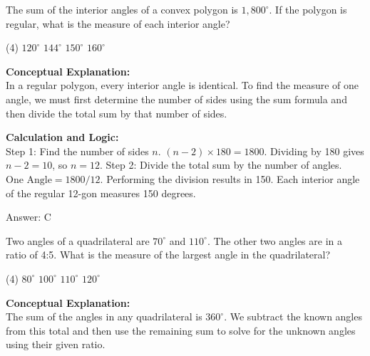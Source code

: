 \documentclass[11pt,paper=a4,answers]{exam}
\begin{document}
\begin{questions}
\question
The sum of the interior angles of a convex polygon is $1,800^\circ$. If the polygon is regular, what is the measure of each interior angle?
\begin{tasks}(4)
    \task $120^\circ$
    \task $144^\circ$
    \task $150^\circ$
    \task $160^\circ$
\end{tasks}

\begin{solution}
\textbf{Conceptual Explanation:} \\
In a regular polygon, every interior angle is identical. To find the measure of one angle, we must first determine the number of sides using the sum formula and then divide the total sum by that number of sides.

\vspace{30pt}

\textbf{Calculation and Logic:} \\
Step 1: Find the number of sides $n$. $(n - 2) \times 180 = 1800$. Dividing by 180 gives $n - 2 = 10$, so $n = 12$. Step 2: Divide the total sum by the number of angles. $\text{One Angle} = 1800 / 12$. Performing the division results in 150. Each interior angle of the regular 12-gon measures 150 degrees.

\vspace{30pt}

Answer: \colorbox{yellow!100}{C}
\end{solution}

\vspace{60pt}

\question
Two angles of a quadrilateral are $70^\circ$ and $110^\circ$. The other two angles are in a ratio of 4:5. What is the measure of the largest angle in the quadrilateral?
\begin{tasks}(4)
    \task $80^\circ$
    \task $100^\circ$
    \task $110^\circ$
    \task $120^\circ$
\end{tasks}

\begin{solution}
\textbf{Conceptual Explanation:} \\
The sum of the angles in any quadrilateral is $360^\circ$. We subtract the known angles from this total and then use the remaining sum to solve for the unknown angles using their given ratio.

\vspace{30pt}


\end{solution}
\end{questions}
\end{document}

